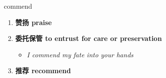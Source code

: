
\begin{frame}
{\huge commend}
\begin{center}
\begin{enumerate}\Large
  \item \textbf{赞扬 praise}
  \item \textbf{委托保管 to entrust for care or preservation}
  \begin{itemize}
    \item \em{\Large{I commend my fate into your hands}}
  \end{itemize}
  \item \textbf{推荐 recommend}
\end{enumerate}
\end{center}
\end{frame}
